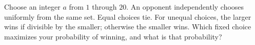 Choose an integer $a$ from $1$ through $20$. An opponent independently chooses uniformly from the same set. Equal choices tie. For unequal choices, the larger wins if divisible by the smaller; otherwise the smaller wins. Which fixed choice maximizes your probability of winning, and what is that probability?
